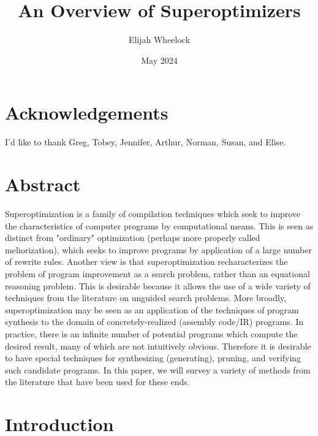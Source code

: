 \documentclass[12pt,twoside]{reedthesis}
\title{An Overview of Superoptimizers}
\author{Elijah Wheelock}
\date{May 2024}
\begin{document}
\maketitle
\frontmatter %
\pagestyle{empty} %
\chapter*{Acknowledgements} %
I'd like to thank Greg, Tobey, Jennifer, Arthur, Norman, Susan, and Elise.
\tableofcontents

\chapter*{Abstract} %
    Superoptimization is a family of compilation techniques which seek to improve the characteristics of computer programs by computational means.
    This is seen as distinct from "ordinary" optimization (perhaps more properly called meliorization), which seeks to improve programs by application of a large number of rewrite rules.
    Another view is that superoptimization recharacterizes the problem of program improvement as a search problem, rather than an equational reasoning problem.
    This is desirable because it allows the use of a wide variety of techniques from the literature on unguided search problems.
    More broadly, superoptimization may be seen as an application of the techniques of program synthesis to the domain of concretely-realized (assembly code/IR) programs.
    In practice, there is an infinite number of potential programs which compute the desired result, many of which are not intuitively obvious.
    Therefore it is desirable to have special techniques for synthesizing (generating), pruning, and verifying such candidate programs. 
    In this paper, we will survey a variety of methods from the literature that have been used for these ends.

\mainmatter %
\pagestyle{fancyplain} %
\chapter*{Introduction} %
    \singlespacing %
    
\end{document}
